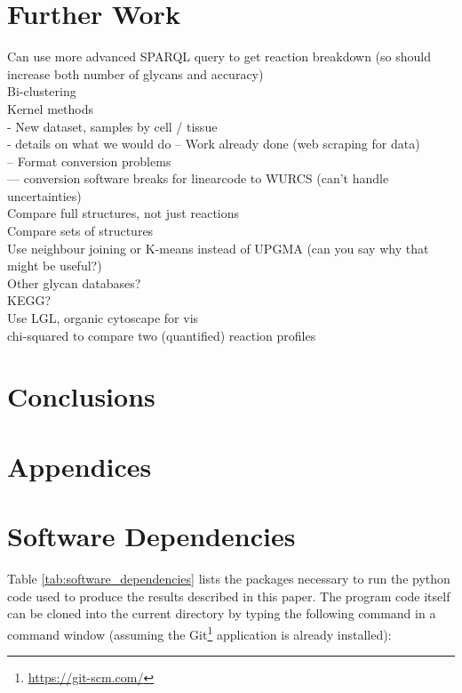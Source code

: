 \documentclass[12pt,a4paper]{article}
\begin{document}
\newpage
\section{Further Work}
\label{sec:further_work}

Can use more advanced SPARQL query to get reaction breakdown (so should increase both number of glycans and accuracy)\\

Bi-clustering\\

Kernel methods\\

- New dataset, samples by cell / tissue\\
- details on what we would do
-- Work already done (web scraping for data)\\
-- Format conversion problems\\
--- conversion software breaks for linearcode to WURCS (can't handle uncertainties)\\

Compare full structures, not just reactions\\

Compare sets of structures\\

Use neighbour joining or K-means instead of UPGMA (can you say why that might be useful?)\\

Other glycan databases?\\

KEGG?\\

Use LGL, organic cytoscape for vis\\

chi-squared to compare two (quantified) reaction profiles\\

\newpage
\section{Conclusions}
\label{sec:conclusions}

\newpage
\section*{Appendices}
\appendix
\section{Software Dependencies}
\label{sec:software_dependencies}
Table \ref{tab:software_dependencies} lists the packages necessary to run the python code used to produce the results described in this paper. The program code itself can be cloned into the current directory by typing the following command in a command window (assuming the Git\footnote{\url{https://git-scm.com/}} application is already installed):
\end{document}
